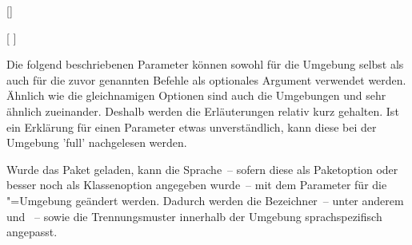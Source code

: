 \begin{Declaration*}{}
\begin{Declaration*}{}
\begin{Declaration*}{}
\begin{Declaration}{[]}
\begin{Declaration}{%
  [%
  ]%
}
\begin{Declaration}{}
\begin{Declaration}{}
\begin{Declaration}{%
}
\begin{Declaration}{%
}
\begin{Declaration}{}
\begin{Declaration}{%
}
\begin{Declaration}{}
\begin{Declaration}{}
\begin{Declaration}{}
Die folgend beschriebenen Parameter können sowohl für die Umgebung 
 selbst als auch für die zuvor genannten Befehle als 
optionales Argument verwendet werden. Ähnlich wie die gleichnamigen Optionen 
sind auch die Umgebungen  und  
sehr ähnlich zueinander. Deshalb werden die Erläuterungen relativ kurz 
gehalten. Ist ein Erklärung für einen Parameter etwas unverständlich, kann 
diese bei der Umgebung 'full' nachgelesen werden.

Wurde das Paket  geladen, kann die Sprache~-- sofern diese als 
Paketoption oder besser noch als Klassenoption angegeben wurde~-- mit dem 
Parameter  für die 
"=Umgebung geändert werden. Dadurch werden die 
Bezeichner~-- unter anderem  und ~-- 
sowie die Trennungsmuster innerhalb der Umgebung sprachspezifisch angepasst. 


\end{Declaration}
\end{Declaration}
\end{Declaration}
\end{Declaration}
\end{Declaration}
\end{Declaration}
\end{Declaration}
\end{Declaration}
\end{Declaration}
\end{Declaration}
\end{Declaration}
\end{Declaration*}
\end{Declaration*}
\end{Declaration*}
